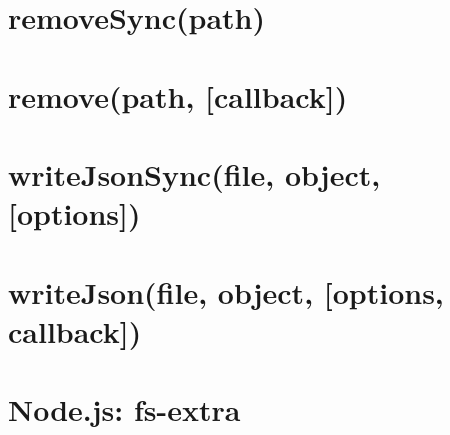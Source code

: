 \documentclass[twoside]{book}
\newcommand{\+}{\discretionary{\mbox{\scriptsize$\hookleftarrow$}}{}{}}
\begin{document}
\chapter{remove\+Sync(path)}
\label{md_dsmacc_vis_degree_node_modules_electron-packager_node_modules_electron-download_node_modules_fs-extra_docs_remove-sync}

\chapter{remove(path, \mbox{[}callback\mbox{]})}
\label{md_dsmacc_vis_degree_node_modules_electron-packager_node_modules_electron-download_node_modules_fs-extra_docs_remove}

\chapter{write\+Json\+Sync(file, object, \mbox{[}options\mbox{]})}
\label{md_dsmacc_vis_degree_node_modules_electron-packager_node_modules_electron-download_node_modules_fs-extra_docs_writeJson-sync}

\chapter{write\+Json(file, object, \mbox{[}options, callback\mbox{]})}
\label{md_dsmacc_vis_degree_node_modules_electron-packager_node_modules_electron-download_node_modules_fs-extra_docs_writeJson}

\chapter{Node.\+js\+: fs-\/extra}
\label{md_dsmacc_vis_degree_node_modules_electron-packager_node_modules_electron-download_node_modules_fs-extra_README}

\end{document}
